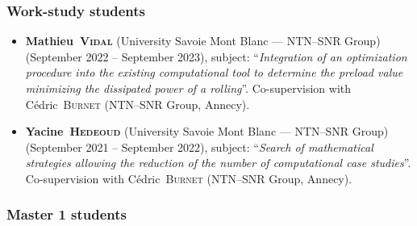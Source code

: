 \documentclass[final, a4paper, oneside, 12pt]{article}
\numberwithin{equation}{section}
\begin{document}
\subsubsection{Work-study students}

\begin{itemize}

  \item \textbf{Mathieu~\textsc{Vidal}} (University Savoie Mont Blanc --- NTN--SNR Group) (September 2022 -- September 2023), subject: ``\textit{Integration of an optimization procedure into the existing computational tool to determine the preload value minimizing the dissipated power of a rolling}''. Co-supervision with C\'edric~\textsc{Burnet} (NTN--SNR Group, Annecy).

  \item \textbf{Yacine~\textsc{Hedeoud}} (University Savoie Mont Blanc --- NTN--SNR Group) (September 2021 -- September 2022), subject: ``\textit{Search of mathematical strategies allowing the reduction of the number of computational case studies}''. Co-supervision with C\'edric~\textsc{Burnet} (NTN--SNR Group, Annecy).
  
\end{itemize}

\subsubsection{Master 1 students}
\end{document}
